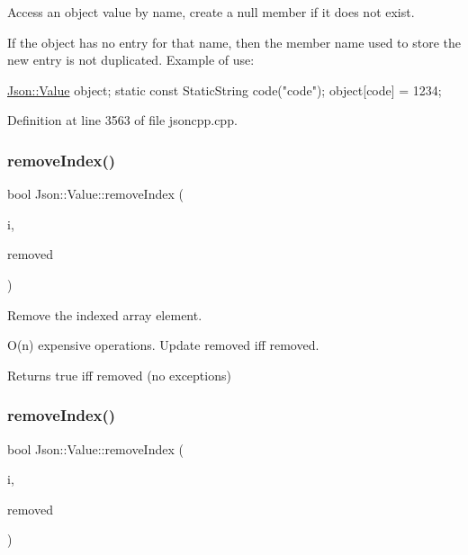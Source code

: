 Access an object value by name, create a null member if it does not exist. 

If the object has no entry for that name, then the member name used to store the new entry is not duplicated. Example of use\+: 
\begin{DoxyCode}
\hyperlink{class_json_1_1_value}{Json::Value} object;
\textcolor{keyword}{static} \textcolor{keyword}{const} StaticString code(\textcolor{stringliteral}{"code"});
\textcolor{keywordtype}{object}[code] = 1234;
\end{DoxyCode}
 

Definition at line 3563 of file jsoncpp.\+cpp.

\hypertarget{class_json_1_1_value_ae9e67e08a85a2f3be3396ec0f4c47f65}{}\label{class_json_1_1_value_ae9e67e08a85a2f3be3396ec0f4c47f65} 
\subsubsection{\texorpdfstring{remove\+Index()}{removeIndex()}\hspace{0.1cm}{\footnotesize\ttfamily [1/2]}}
{\footnotesize\ttfamily bool Json\+::\+Value\+::remove\+Index (\begin{DoxyParamCaption}\item[{\hyperlink{class_json_1_1_value_a184a91566cccca7b819240f0d5561c7d}{Array\+Index}}]{i,  }\item[{\hyperlink{class_json_1_1_value}{Value} $\ast$}]{removed }\end{DoxyParamCaption})}



Remove the indexed array element. 

O(n) expensive operations. Update \textquotesingle{}removed\textquotesingle{} iff removed. \begin{DoxyReturn}{Returns}
true iff removed (no exceptions) 
\end{DoxyReturn}
\hypertarget{class_json_1_1_value_ae9e67e08a85a2f3be3396ec0f4c47f65}{}\label{class_json_1_1_value_ae9e67e08a85a2f3be3396ec0f4c47f65} 
\subsubsection{\texorpdfstring{remove\+Index()}{removeIndex()}\hspace{0.1cm}{\footnotesize\ttfamily [2/2]}}
{\footnotesize\ttfamily bool Json\+::\+Value\+::remove\+Index (\begin{DoxyParamCaption}\item[{\hyperlink{class_json_1_1_value_a184a91566cccca7b819240f0d5561c7d}{Array\+Index}}]{i,  }\item[{\hyperlink{class_json_1_1_value}{Value} $\ast$}]{removed }\end{DoxyParamCaption})}



